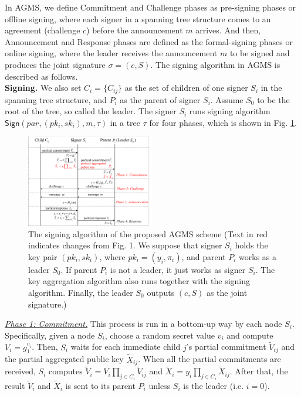 \documentclass[journal]{IEEEtran}
\begin{document}
In AGMS, we define Commitment and Challenge phases as pre-signing phases or offline signing, where each signer in a spanning tree structure comes to an agreement (challenge \(c\)) before the announcement \(m\) arrives. And then, Announcement and Response phases are defined as the formal-signing phases or online signing, where the leader receives the announcement \(m\) to be signed and produces the joint signature \(\sigma= (c,S)\). The signing algorithm in AGMS is described as follows.\\

\noindent\textbf{Signing.} We also set \(C_i=\{C_{ij}\}\) as the set of children of one signer \(S_i\) in the spanning tree structure, and \(P_i\) as the parent of signer \(S_i\). Assume \(S_0\) to be the root of the tree, so called the leader. The signer \(S_i\) runs signing algorithm \(\textsf{Sign}(par,(pk_i, sk_i),m,\tau)\) in a tree \(\tau\) for four phases, which is shown in Fig. \ref{AGMS}.

\begin{figure}
\includegraphics[width=0.5\textwidth]{AGMS-eps-converted-to.pdf}
\caption{The signing algorithm of the proposed AGMS scheme (Text in red indicates changes from Fig. 1. We suppose that signer \(S_i\) holds the key pair \((pk_i,sk_i)\), where \(pk_i=(y_i,\pi_i)\), and parent \(P_i\) works as a leader \(S_0\). If parent \(P_i\) is not a leader, it just works as signer \(S_i\). The key aggregation algorithm also runs together with the signing algorithm. Finally, the leader \(S_0\) outputs \((c,S)\) as the joint signature.)}
\label{AGMS}
\end{figure}

\noindent\emph{\underline{Phase 1: Commitment.}} This process is run in a bottom-up way by each node \(S_i\). Specifically, given a node \(S_i\), choose a random secret value \(v_i\) and compute \(V_i=g_1^{v_i}\). Then, \(S_i\) waits for each immediate child \(j\)'s partial commitment \(\tilde{V}_{ij}\) and the partial aggregated public key \(\tilde{X}_{ij}\). When all the partial commitments are received, \(S_i\) computes \(\tilde{V}_i=V_i\prod_{j\in C_i} \tilde{V}_{ij}\) and \(\tilde{X}_i=y_i\prod_{j\in C_i}{\tilde{X}_{ij}}\). After that, the result \(\tilde{V}_i\) and \(\tilde{X}_i\) is sent to its parent \(P_i\) unless \(S_i\) is the leader (i.e. \(i=0\)).
\end{document}
